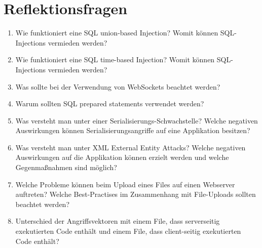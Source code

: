 \section{Reflektionsfragen}

\begin{enumerate}
	\item Wie funktioniert eine SQL union-based Injection? Womit können SQL-Injections vermieden werden?
	\item Wie funktioniert eine SQL time-based Injection? Womit können SQL-Injections vermieden werden?
	\item Was sollte bei der Verwendung von WebSockets beachtet werden?
	\item Warum sollten SQL prepared statements verwendet werden?
	\item Was versteht man unter einer Serialisierungs-Schwachstelle? Welche negativen Auswirkungen können Serialisierungsangriffe auf eine Applikation besitzen?
	\item Was versteht man unter XML External Entity Attacks? Welche negativen Auswirkungen auf die Applikation können erzielt werden und welche Gegenmaßnahmen sind möglich?
	\item Welche Probleme können beim Upload eines Files auf einen Webserver auftreten? Welche Best-Practises im Zusammenhang mit File-Uploads sollten beachtet werden?
	\item Unterschied der Angriffsvektoren mit einem File, dass serverseitig exekutierten Code enthält und einem File, dass client-seitig exekutierten Code enthält?
\end{enumerate}
